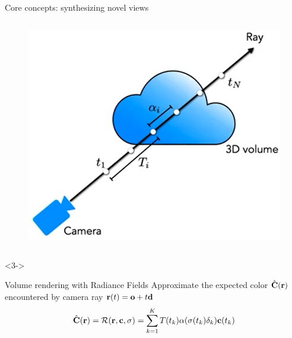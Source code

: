 \documentclass[aspectratio=1610]{beamer}
\begin{document}
\begin{frame}{Core concepts: synthesizing novel views}
\begin{columns}
\begin{column}{.3\textwidth}
            \begin{figure}[H]
                \includegraphics[width=\textwidth,keepaspectratio]{tracing}
            \end{figure}
        \end{column}
    \end{columns}
    \begin{onlyenv}<3->
        \begin{block}{Volume rendering with Radiance Fields} 
            Approximate the expected color \(\hat{\vb{C}}(\vb{r})\) encountered by camera ray \(\vb{r}(t) = \vb{o} + t\vb{d}\)
            \begin{equation*}
                \hat{\vb{C}}(\vb{r}) = \mathcal{R}(\vb{r}, \vb{c}, \sigma) = \sum_{k = 1}^{K} T(t_k) \alpha (\sigma (t_k)\delta_k) \vb{c}(t_k)
            \end{equation*}
        \end{block}
    \end{onlyenv}
\end{frame}
\end{document}
